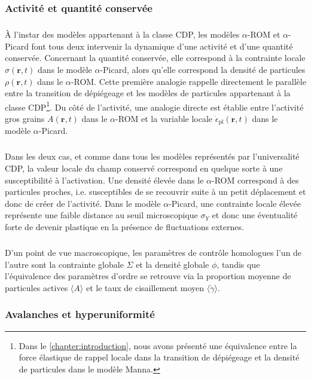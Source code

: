 \subsubsection{Activité et quantité conservée}

\subparagraph{}\`A l'instar des modèles appartenant à la classe CDP, les modèles $\alpha$-ROM et $\alpha$-Picard font tous deux intervenir la dynamique d'une activité et d'une quantité conservée. Concernant la quantité conservée, elle correspond à la contrainte locale $\sigma(\mathbf{r},t)$ dans le modèle $\alpha$-Picard, alors qu'elle correspond la densité de particules $\rho(\mathbf{r}, t)$ dans le $\alpha$-ROM. Cette première analogie rappelle directement le parallèle entre la transition de dépiégeage et les modèles de particules appartenant à la classe CDP\footnote{Dans le \autoref{chapter:introduction}, nous avons présenté une équivalence entre la force élastique de rappel locale dans la transition de dépiégeage et la densité de particules dans le modèle Manna.}. Du côté de l'activité, une analogie directe est établie entre l'activité gros grains $A(\mathbf{r}, t)$ dans le $\alpha$-ROM et la variable locale $\dot{\epsilon}_\text{pl}(\mathbf{r}, t)$ dans le modèle $\alpha$-Picard.

\subparagraph{}Dans les deux cas, et comme dans tous les modèles représentés par l'universalité CDP, la valeur locale du champ conservé correspond en quelque sorte à une susceptibilité à l'activation. Une densité élevée dans le $\alpha$-ROM correspond à des particules proches, i.e. susceptibles de se recouvrir suite à un petit déplacement et donc de créer de l'activité. Dans le modèle $\alpha$-Picard, une contrainte locale élevée représente une faible distance au seuil microscopique $\sigma_Y$ et donc une éventualité forte de devenir plastique en la présence de fluctuations externes.

\subparagraph{}D'un point de vue macroscopique, les paramètres de contrôle homologues l'un de l'autre sont la contrainte globale $\Sigma$ et la densité globale $\phi$, tandis que l'équivalence des paramètres d'ordre se retrouve via la proportion moyenne de particules actives $\langle A \rangle $ et le taux de cisaillement moyen $\langle \dot{\gamma}\rangle$.

\subsubsection{Avalanches et hyperuniformité}

